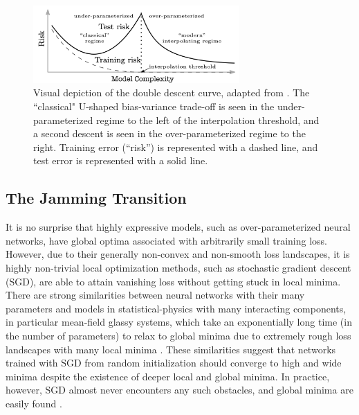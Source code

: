 \documentclass[a4paper, 11pt]{article}
\begin{document}
\begin{figure}[ht]
\centering
\includegraphics[width=0.7\textwidth]{docs/assets/double_descent_reconciling.png}
\caption{Visual depiction of the double descent curve, adapted from \cite{belkinReconcilingModernMachine2019}. The ``classical" U-shaped bias-variance trade-off is seen in the under-parameterized regime to the left of the interpolation threshold, and a second descent is seen in the over-parameterized regime to the right. Training error (``risk'') is represented with a dashed line, and test error is represented with a solid line.}
\label{doubledescent}
\end{figure}



\subsection{The Jamming Transition}

It is no surprise that highly expressive models, such as over-parameterized neural networks, have global optima associated with arbitrarily small training loss. However, due to their generally non-convex and non-smooth loss landscapes, it is highly non-trivial local optimization methods, such as stochastic gradient descent (SGD), are able to attain vanishing loss without getting stuck in local minima. There are strong similarities between neural networks with their many parameters and models in statistical-physics with many interacting components, in particular mean-field glassy systems, which take an exponentially long time (in the number of parameters) to relax to global minima due to extremely rough loss landscapes with many local minima \cite{choromanskaLossSurfacesMultilayer}. These similarities suggest that networks trained with SGD from random initialization should converge to high and wide minima despite the existence of deeper local and global minima. In practice, however, SGD almost never encounters any such obstacles, and global minima are easily found \cite{goodfellowQualitativelyCharacterizingNeural2015}.\\
\end{document}
